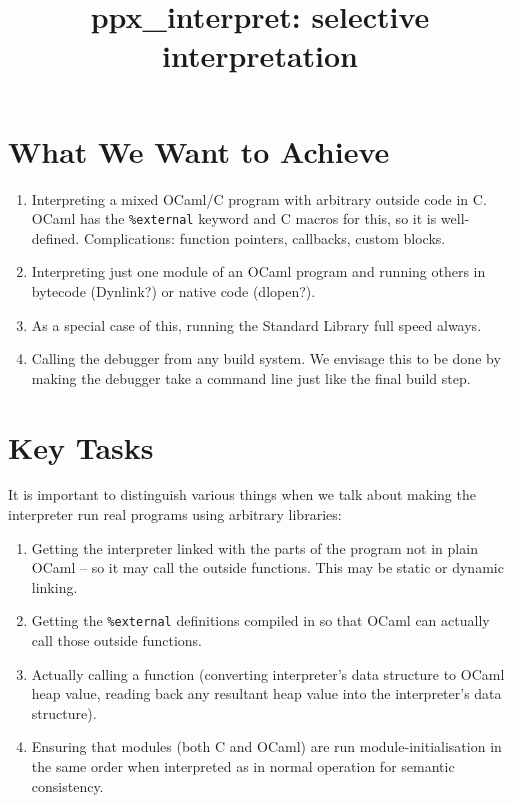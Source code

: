\documentclass[10pt]{article}
\begin{document}
\title{\textsf{ppx\_interpret}: selective interpretation}
\maketitle

\section*{What We Want to Achieve}

\begin{enumerate}
\item Interpreting a mixed OCaml/C program with arbitrary outside code in C. OCaml has the \texttt{\%external} keyword and C macros for this, so it is well-defined. Complications: function pointers, callbacks, custom blocks.
\item Interpreting just one module of an OCaml program and running others in bytecode (Dynlink?) or native code (dlopen?).
\item As a special case of this, running the Standard Library full speed always.
\item Calling the debugger from any build system. We envisage this to be done by making the debugger take a command line just like the final build step.
\end{enumerate}

\section*{Key Tasks}

It is important to distinguish various things when we talk about making the interpreter run real programs using arbitrary libraries:

\begin{enumerate}
\item Getting the interpreter linked with the parts of the program not in plain OCaml -- so it may call the outside functions. This may be static or dynamic linking.
\item Getting the \texttt{\%external} definitions compiled in so that OCaml can actually call those outside functions.
\item Actually calling a function (converting interpreter's data structure to OCaml heap value, reading back any resultant heap value into the interpreter's data structure).
\item Ensuring that modules (both C and OCaml) are run module-initialisation in the same order when interpreted as in normal operation for semantic consistency.
\end{enumerate}
\end{document}
